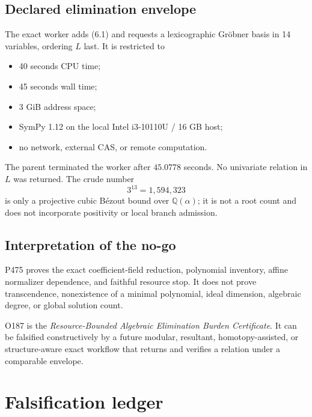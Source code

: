 \documentclass[11pt,a4paper,openany]{report}
\newcommand{\Q}{\mathbb Q}
\begin{document}
\section{Declared elimination envelope}

The exact worker adds (6.1) and requests a lexicographic Gr\"obner basis in
14 variables, ordering \(L\) last. It is restricted to
\begin{itemize}
\item 40 seconds CPU time;
\item 45 seconds wall time;
\item 3 GiB address space;
\item SymPy 1.12 on the local Intel i3-10110U / 16 GB host;
\item no network, external CAS, or remote computation.
\end{itemize}

The parent terminated the worker after \(45.0778\) seconds. No univariate
relation in \(L\) was returned. The crude number
\[
 3^{13}=1,594,323
\]
is only a projective cubic B\'ezout bound over \(\Q(\alpha)\); it is not a
root count and does not incorporate positivity or local branch admission.

\section{Interpretation of the no-go}

P475 proves the exact coefficient-field reduction, polynomial inventory,
affine normalizer dependence, and faithful resource stop. It does not prove
transcendence, nonexistence of a minimal polynomial, ideal dimension,
algebraic degree, or global solution count.

O187 is the \emph{Resource-Bounded Algebraic Elimination Burden
Certificate}. It can be falsified constructively by a future modular,
resultant, homotopy-assisted, or structure-aware exact workflow that returns
and verifies a relation under a comparable envelope.

\chapter{Falsification ledger}
\end{document}
